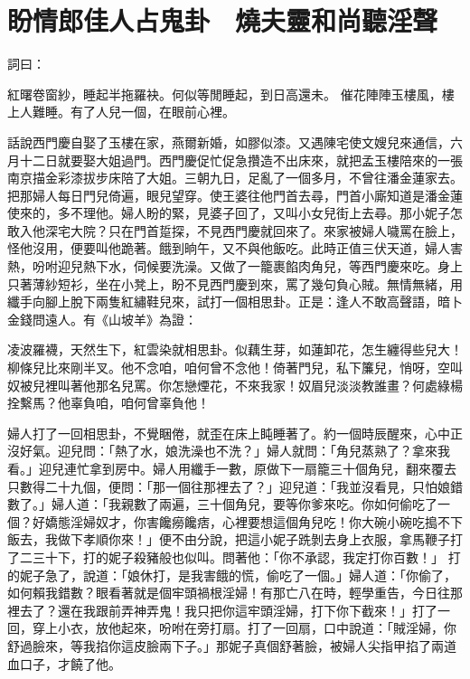 %

\chapter{盼情郎佳人占鬼卦　燒夫靈和尚聽淫聲}

\begin{showcontents}{}


詞曰：

紅曙卷窗紗，睡起半拖羅袂。何似等閒睡起，到日高還未。
催花陣陣玉樓風，樓上人難睡。有了人兒一個，在眼前心裡。

話說西門慶自娶了玉樓在家，燕爾新婚，如膠似漆。又遇陳宅使文嫂兒來通信，六月十二日就要娶大姐過門。西門慶促忙促急攢造不出床來，就把孟玉樓陪來的一張南京描金彩漆拔步床陪了大姐。三朝九日，足亂了一個多月，不曾往潘金蓮家去。把那婦人每日門兒倚遍，眼兒望穿。使王婆往他門首去尋，門首小廝知道是潘金蓮使來的，多不理他。婦人盼的緊，見婆子回了，又叫小女兒街上去尋。那小妮子怎敢入他深宅大院？只在門首踅探，不見西門慶就回來了。來家被婦人噦罵在臉上，怪他沒用，便要叫他跪著。餓到晌午，又不與他飯吃。此時正值三伏天道，婦人害熱，吩咐迎兒熱下水，伺候要洗澡。又做了一籠裹餡肉角兒，等西門慶來吃。身上只著薄紗短衫，坐在小凳上，盼不見西門慶到來，罵了幾句負心賊。無情無緒，用纖手向腳上脫下兩隻紅繡鞋兒來，試打一個相思卦。正是：逢人不敢高聲語，暗卜金錢問遠人。有《山坡羊》為證：

凌波羅襪，天然生下，紅雲染就相思卦。似藕生芽，如蓮卸花，怎生纏得些兒大！柳條兒比來剛半叉。他不念咱，咱何曾不念他！倚著門兒，私下簾兒，悄呀，空叫奴被兒裡叫著他那名兒罵。你怎戀煙花，不來我家！奴眉兒淡淡教誰畫？何處綠楊拴繫馬？他辜負咱，咱何曾辜負他！

婦人打了一回相思卦，不覺睏倦，就歪在床上盹睡著了。約一個時辰醒來，心中正沒好氣。迎兒問：「熱了水，娘洗澡也不洗？」婦人就問：「角兒蒸熟了？拿來我看。」迎兒連忙拿到房中。婦人用纖手一數，原做下一扇籠三十個角兒，翻來覆去只數得二十九個，便問：「那一個往那裡去了？」迎兒道：「我並沒看見，只怕娘錯數了。」婦人道：「我親數了兩遍，三十個角兒，要等你爹來吃。你如何偷吃了一個？好嬌態淫婦奴才，你害饞癆饞痞，心裡要想這個角兒吃！你大碗小碗吃搗不下飯去，我做下孝順你來！」便不由分說，把這小妮子跣剝去身上衣服，拿馬鞭子打了二三十下，打的妮子殺豬般也似叫。問著他：「你不承認，我定打你百數！」 打的妮子急了，說道：「娘休打，是我害餓的慌，偷吃了一個。」婦人道：「你偷了，如何賴我錯數？眼看著就是個牢頭禍根淫婦！有那亡八在時，輕學重告，今日往那裡去了？還在我跟前弄神弄鬼！我只把你這牢頭淫婦，打下你下截來！」打了一回，穿上小衣，放他起來，吩咐在旁打扇。打了一回扇，口中說道：「賊淫婦，你舒過臉來，等我掐你這皮臉兩下子。」那妮子真個舒著臉，被婦人尖指甲掐了兩道血口子，才饒了他。


\end{showcontents}
